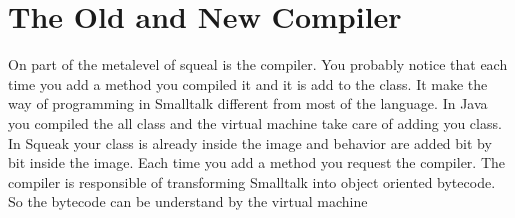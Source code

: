 \documentclass[a4paper,10pt,twoside]{book}
\begin{document}
	\renewcommand{\nnbb}[2]{} %
	\sloppy
\fi
\chapter{The Old and New Compiler}
\label{cha:compiler}

On part of the metalevel of squeal is the compiler. 
You probably notice that each time you add a method you compiled it and it is add to the class.
It make the way of programming in Smalltalk different from most of the language.
In Java you compiled the all class and the virtual machine take care of adding you class.
In Squeak your class is already inside the image and behavior are added bit by bit inside the image.
Each time you add a method you request the compiler.
The compiler is responsible of transforming Smalltalk into object oriented bytecode. 
So the bytecode can be understand by the virtual machine


\ifx\wholebook\relax\else
   
   
\end{document}
